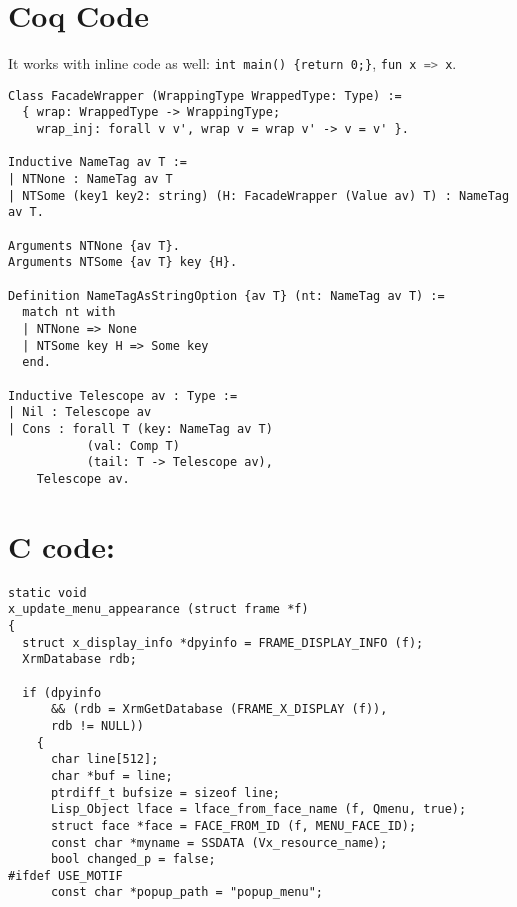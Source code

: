 \documentclass{article}
\def\coqverb{\verb}
\def\cverb{\lstinline[language=c]}
\begin{document}
\section*{Coq Code}

It works with inline code as well: \coqverb|int main() {return 0;}|, \cverb|fun x => x|.

\begin{verbatim}
Class FacadeWrapper (WrappingType WrappedType: Type) :=
  { wrap: WrappedType -> WrappingType;
    wrap_inj: forall v v', wrap v = wrap v' -> v = v' }.

Inductive NameTag av T :=
| NTNone : NameTag av T
| NTSome (key1 key2: string) (H: FacadeWrapper (Value av) T) : NameTag av T.

Arguments NTNone {av T}.
Arguments NTSome {av T} key {H}.

Definition NameTagAsStringOption {av T} (nt: NameTag av T) :=
  match nt with
  | NTNone => None
  | NTSome key H => Some key
  end.

Inductive Telescope av : Type :=
| Nil : Telescope av
| Cons : forall T (key: NameTag av T)
           (val: Comp T)
           (tail: T -> Telescope av),
    Telescope av.
\end{verbatim}

\section*{C code:}
\begin{verbatim}
static void
x_update_menu_appearance (struct frame *f)
{
  struct x_display_info *dpyinfo = FRAME_DISPLAY_INFO (f);
  XrmDatabase rdb;

  if (dpyinfo
      && (rdb = XrmGetDatabase (FRAME_X_DISPLAY (f)),
      rdb != NULL))
    {
      char line[512];
      char *buf = line;
      ptrdiff_t bufsize = sizeof line;
      Lisp_Object lface = lface_from_face_name (f, Qmenu, true);
      struct face *face = FACE_FROM_ID (f, MENU_FACE_ID);
      const char *myname = SSDATA (Vx_resource_name);
      bool changed_p = false;
#ifdef USE_MOTIF
      const char *popup_path = "popup_menu";
\end{verbatim}
\end{document}
